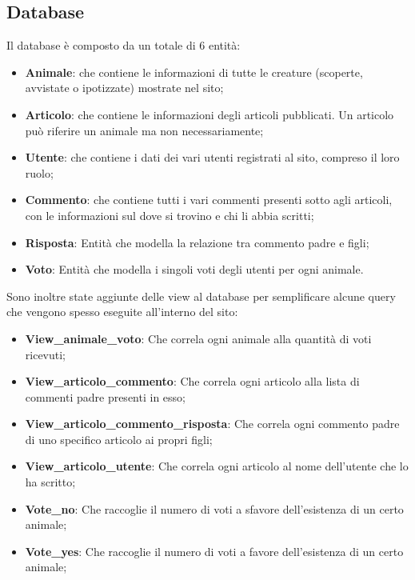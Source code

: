 \subsection{Database}
Il database è composto da un totale di 6 entità:
\begin{itemize}
	\item \textbf{Animale}: che contiene le informazioni di tutte le creature (scoperte, avvistate o ipotizzate) mostrate nel sito;
	\item \textbf{Articolo}: che contiene le informazioni degli articoli pubblicati. Un articolo può riferire un animale ma non necessariamente;
	\item \textbf{Utente}: che contiene i dati dei vari utenti registrati al sito, compreso il loro ruolo;
	\item \textbf{Commento}: che contiene tutti i vari commenti presenti sotto agli articoli, con le informazioni sul dove si trovino e chi li abbia scritti;
	\item \textbf{Risposta}: Entità che modella la relazione tra commento padre e figli;
	\item \textbf{Voto}: Entità che modella  i singoli voti degli utenti per ogni animale.
\end{itemize}
Sono inoltre state aggiunte delle view al database per semplificare alcune query che vengono spesso eseguite all'interno del sito:
\begin{itemize}
	\item \textbf{View\_animale\_voto}: Che correla ogni animale alla quantità di voti ricevuti;
	\item \textbf{View\_articolo\_commento}: Che correla ogni articolo alla lista di commenti padre presenti in esso;
	\item \textbf{View\_articolo\_commento\_risposta}: Che correla ogni commento padre di uno specifico articolo ai propri figli;
	\item \textbf{View\_articolo\_utente}: Che correla ogni articolo al nome dell'utente che lo ha scritto;
	\item \textbf{Vote\_no}: Che raccoglie il numero di voti a sfavore dell'esistenza di un certo animale;
	\item \textbf{Vote\_yes}: Che raccoglie il numero di voti a favore dell'esistenza di un certo animale;
\end{itemize}

